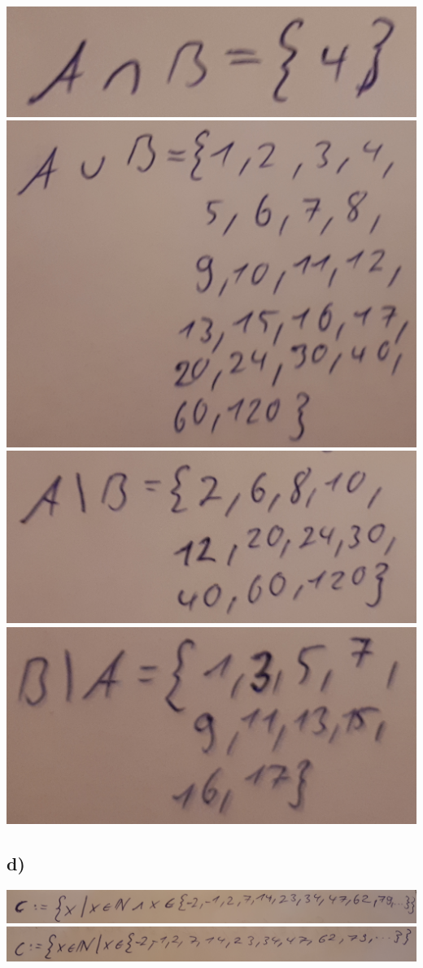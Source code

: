 \includegraphics[width=\textwidth]{part/S1A1MASB}
\includegraphics[width=\textwidth]{part/S1A1MAVB}
\includegraphics[width=\textwidth]{part/S1A1MAMB}
\includegraphics[width=\textwidth]{part/S1A1MBMA}

\subsection*{d)}

\includegraphics[width=\textwidth]{part/S1A1MC1}
\includegraphics[width=\textwidth]{part/S1A1MC2}